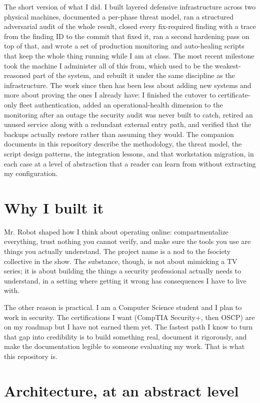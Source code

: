 \documentclass[12pt]{article}
\begin{document}
The short version of what I did. I built layered defensive infrastructure across two physical machines, documented a per-phase threat model, ran a structured adversarial audit of the whole result, closed every fix-required finding with a trace from the finding ID to the commit that fixed it, ran a second hardening pass on top of that, and wrote a set of production monitoring and auto-healing scripts that keep the whole thing running while I am at class. The most recent milestone took the machine I administer all of this from, which used to be the weakest-reasoned part of the system, and rebuilt it under the same discipline as the infrastructure. The work since then has been less about adding new systems and more about proving the ones I already have: I finished the cutover to certificate-only fleet authentication, added an operational-health dimension to the monitoring after an outage the security audit was never built to catch, retired an unused service along with a redundant external entry path, and verified that the backups actually restore rather than assuming they would. The companion documents in this repository describe the methodology, the threat model, the script design patterns, the integration lessons, and that workstation migration, in each case at a level of abstraction that a reader can learn from without extracting my configuration.

\section{Why I built it}

Mr. Robot shaped how I think about operating online: compartmentalize everything, trust nothing you cannot verify, and make sure the tools you use are things you actually understand. The project name is a nod to the fsociety collective in the show. The substance, though, is not about mimicking a TV series; it is about building the things a security professional actually needs to understand, in a setting where getting it wrong has consequences I have to live with.

The other reason is practical. I am a Computer Science student and I plan to work in security. The certifications I want (CompTIA Security+, then OSCP) are on my roadmap but I have not earned them yet. The fastest path I know to turn that gap into credibility is to build something real, document it rigorously, and make the documentation legible to someone evaluating my work. That is what this repository is.

\section{Architecture, at an abstract level}
\end{document}
